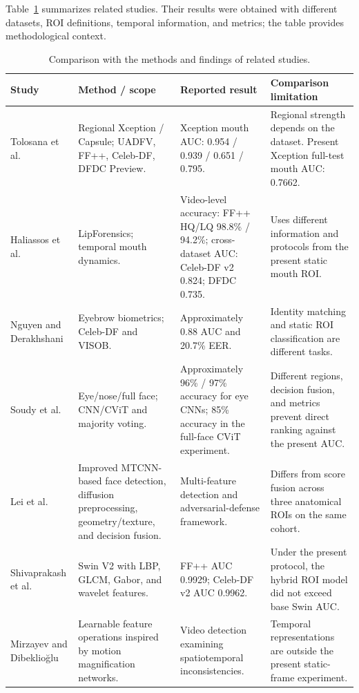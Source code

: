 \documentclass[a4paper]{elektr}
\begin{document}
Table~\ref{tab:literature} summarizes related studies. Their results were obtained with different datasets, ROI definitions, temporal information, and metrics; the table provides methodological context.
\begin{table}[!htbp]\centering\begin{minipage}{15.8cm}
\caption{Comparison with the methods and findings of related studies.}\label{tab:literature}
\centering \small
\begin{tabular}{>{\raggedright\arraybackslash}p{2.2cm}>{\raggedright\arraybackslash}p{3.0cm}>{\raggedright\arraybackslash}p{4.1cm}>{\raggedright\arraybackslash}p{4.1cm}}\toprule
Study & Method / scope & Reported result & Comparison limitation \\\midrule
Tolosana et al. \cite{tolosana} & Regional Xception / Capsule; UADFV, FF++, Celeb-DF, DFDC Preview. & Xception mouth AUC: 0.954 / 0.939 / 0.651 / 0.795. & Regional strength depends on the dataset. Present Xception full-test mouth AUC: 0.7662. \\
Haliassos et al. \cite{haliassos} & LipForensics; temporal mouth dynamics. & Video-level accuracy: FF++ HQ/LQ 98.8\% / 94.2\%; cross-dataset AUC: Celeb-DF v2 0.824; DFDC 0.735. & Uses different information and protocols from the present static mouth ROI. \\
Nguyen and Derakhshani \cite{nguyen} & Eyebrow biometrics; Celeb-DF and VISOB. & Approximately 0.88 AUC and 20.7\% EER. & Identity matching and static ROI classification are different tasks. \\
Soudy et al. \cite{soudy} & Eye/nose/full face; CNN/CViT and majority voting. & Approximately 96\% / 97\% accuracy for eye CNNs; 85\% accuracy in the full-face CViT experiment. & Different regions, decision fusion, and metrics prevent direct ranking against the present AUC. \\
Lei et al. \cite{lei} & Improved MTCNN-based face detection, diffusion preprocessing, geometry/texture, and decision fusion. & Multi-feature detection and adversarial-defense framework. & Differs from score fusion across three anatomical ROIs on the same cohort. \\
Shivaprakash et al. \cite{shivaprakash} & Swin V2 with LBP, GLCM, Gabor, and wavelet features. & FF++ AUC 0.9929; Celeb-DF v2 AUC 0.9962. & Under the present protocol, the hybrid ROI model did not exceed base Swin AUC. \\
Mirzayev and Dibeklioğlu \cite{mirzayev} & Learnable feature operations inspired by motion magnification networks. & Video detection examining spatiotemporal inconsistencies. & Temporal representations are outside the present static-frame experiment. \\

\end{tabular}
\end{minipage}
\end{table}
\end{document}
